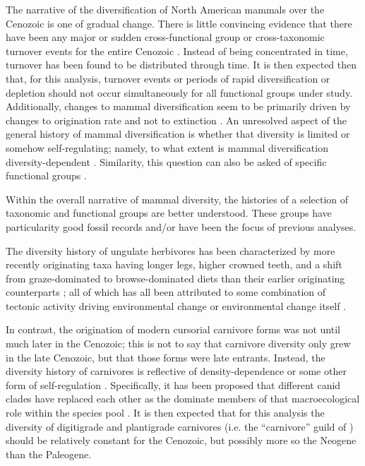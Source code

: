 \documentclass[12pt,letterpaper]{article}
\begin{document}
The narrative of the diversification of North American mammals over the Cenozoic is one of gradual change. There is little convincing evidence that there have been any major or sudden cross-functional group or cross-taxonomic turnover events for the entire Cenozoic \citep{Alroy2009,Alroy1996a,Eronen2015,Janis1993b,Alroy2000g}. Instead of being concentrated in time, turnover has been found to be distributed through time. It is then expected then that, for this analysis, turnover events or periods of rapid diversification or depletion should not occur simultaneously for all functional groups under study. Additionally, changes to mammal diversification seem to be primarily driven by changes to origination rate and not to extinction \citep{Alroy1996a,Alroy2000g,Alroy2009}. An unresolved aspect of the general history of mammal diversification is whether that diversity is limited or somehow self-regulating; namely, to what extent is mammal diversification diversity-dependent \citep{Alroy2009,Rabosky2015b,Harmon2015a,Rabosky2013a}. Similarity, this question can also be asked of specific functional groups \citep{Jernvall2004,Valkenburgh1999,Silvestro2015b,Quental2013}.

Within the overall narrative of mammal diversity, the histories of a selection of taxonomic and functional groups are better understood. These groups have particularity good fossil records and/or have been the focus of previous analyses.

The diversity history of ungulate herbivores has been characterized by more recently originating taxa having longer legs, higher crowned teeth, and a shift from graze-dominated to browse-dominated diets than their earlier originating counterparts \citep{Janis2004,Janis2000,Janis1993c,Janis2008a,Cantalapiedra2017,Fraser2015a}; all of which has all been attributed to some combination of tectonic activity driving environmental change or environmental change itself \citep{Janis2008a,Eronen2015,Blois2009,Badgley2017}. 

In contrast, the origination of modern cursorial carnivore forms was not until much later in the Cenozoic; this is not to say that carnivore diversity only grew in the late Cenozoic, but that those forms were late entrants. Instead, the diversity history of carnivores is reflective of density-dependence or some other form of self-regulation \citep{Valkenburgh1999,Silvestro2015b,Slater2015c}. Specifically, it has been proposed that different canid clades have replaced each other as the dominate members of that macroecological role within the species pool \citep{Silvestro2015b,Valkenburgh1999}. It is then expected that for this analysis the diversity of digitigrade and plantigrade carnivores (i.e. the ``carnivore'' guild of \citet{Valkenburgh1999}) should be relatively constant for the Cenozoic, but possibly more so the Neogene than the Paleogene.
\end{document}
